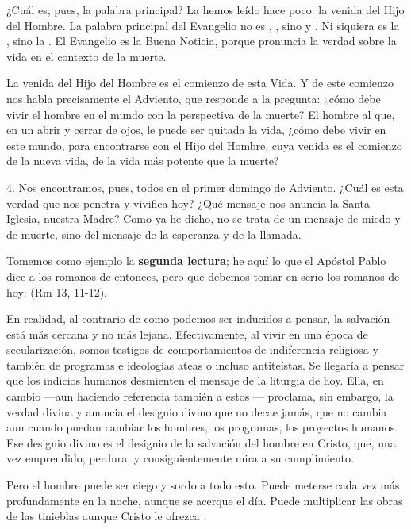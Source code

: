 ¿Cuál es, pues, la palabra principal? La hemos leído hace poco: la venida del Hijo del Hombre. La palabra principal del Evangelio no es , , sino  y . Ni siquiera es la , sino la . El Evangelio es la Buena Noticia, porque pronuncia la verdad sobre la vida en el contexto de la muerte.

La venida del Hijo del Hombre es el comienzo de esta Vida. Y de este comienzo nos habla precisamente el Adviento, que responde a la pregunta: ¿cómo debe vivir el hombre en el mundo con la perspectiva de la muerte? El hombre al que, en un abrir y cerrar de ojos, le puede ser quitada la vida, ¿cómo debe vivir en este mundo, para encontrarse con el Hijo del Hombre, cuya venida es el comienzo de la nueva vida, de la vida más potente que la muerte?

4. Nos encontramos, pues, todos en el primer domingo de Adviento. ¿Cuál es esta verdad que nos penetra y vivifica hoy? ¿Qué mensaje nos anuncia la Santa Iglesia, nuestra Madre? Como ya he dicho, no se trata de un mensaje de miedo y de muerte, sino del mensaje de la esperanza y de la llamada.

Tomemos como ejemplo la \textbf{segunda lectura}; he aquí lo que el Apóstol Pablo dice a los romanos de entonces, pero que debemos tomar en serio los romanos de hoy:  (Rm 13, 11-12).

En realidad, al contrario de como podemos ser inducidos a pensar, la salvación está más cercana y no más lejana. Efectivamente, al vivir en una época de secularización, somos testigos de comportamientos de indiferencia religiosa y también de programas e ideologías ateas o incluso antiteístas. Se llegaría a pensar que los indicios humanos desmienten el mensaje de la liturgia de hoy. Ella, en cambio ---aun haciendo referencia también a estos --- proclama, sin embargo, la verdad divina y anuncia el designio divino que no decae jamás, que no cambia aun cuando puedan cambiar los hombres, los programas, los proyectos humanos. Ese designio divino es el designio de la salvación del hombre en Cristo, que, una vez emprendido, perdura, y consiguientemente mira a su cumplimiento.

Pero el hombre puede ser ciego y sordo a todo esto. Puede meterse cada vez más profundamente en la noche, aunque se acerque el día. Puede multiplicar las obras de las tinieblas aunque Cristo le ofrezca .

